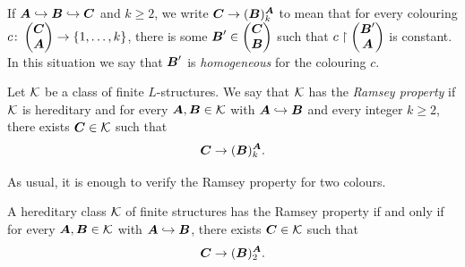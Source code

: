 If \(\boldsymbol{A}\hookrightarrow \boldsymbol{B}\hookrightarrow \boldsymbol{C}\) and \(k \geq 2\), we write \(\boldsymbol{C} \to (\boldsymbol{B})^{\boldsymbol{A}}_k\) to mean that for every colouring
\(c \colon \begin{pmatrix} \boldsymbol{C} \\ \boldsymbol{A} \end{pmatrix} \to \{1,\dots,k\}\), there is some
\(\boldsymbol{B}' \in \begin{pmatrix} \boldsymbol{C} \\ \boldsymbol{B} \end{pmatrix}\) such that
\(c \restriction \begin{pmatrix} \boldsymbol{B}' \\ \boldsymbol{A} \end{pmatrix}\) is constant. In this situation we say that \(\boldsymbol{B}'\) is \emph{homogeneous} for the colouring \(c\).

\begin{definition}
    Let \(\mathcal{K}\) be a class of finite \(L\)-structures. We say that \(\mathcal{K}\) has the \emph{Ramsey property} if \(\mathcal{K}\) is hereditary and for every \(\boldsymbol{A},\boldsymbol{B} \in \mathcal{K}\) with \(\boldsymbol{A}\hookrightarrow \boldsymbol{B}\) and every integer \(k \geq 2\), there exists \(\boldsymbol{C} \in \mathcal{K}\) such that
    \[
        \boldsymbol{C} \to (\boldsymbol{B})^{\boldsymbol{A}}_k.
    \]
\end{definition}

As usual, it is enough to verify the Ramsey property for two colours.

\begin{proposition}
    A hereditary class \(\mathcal{K}\) of finite structures has the Ramsey property if and only if for every \(\boldsymbol{A},\boldsymbol{B} \in \mathcal{K}\) with \(\boldsymbol{A}\hookrightarrow \boldsymbol{B}\), there exists \(\boldsymbol{C} \in \mathcal{K}\) such that
    \[
        \boldsymbol{C} \to (\boldsymbol{B})^{\boldsymbol{A}}_2.
    \]
\end{proposition}

